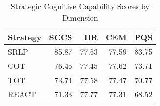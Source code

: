 \begin{table}[htbp]
\centering
\caption{Strategic Cognitive Capability Scores by Dimension}
\label{tab:sccs_by_dimension}
\begin{tabular}{lrrrr}
\toprule
Strategy & SCCS & IIR & CEM & PQS \\
\midrule
SRLP & 85.87 & 77.63 & 77.59 & 83.75 \\
COT & 76.46 & 77.45 & 77.62 & 73.71 \\
TOT & 73.74 & 77.58 & 77.47 & 70.77 \\
REACT & 71.33 & 77.77 & 77.31 & 68.52 \\
\bottomrule
\end{tabular}
\end{table}